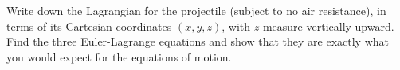 \documentclass[../main.tex]{subfiles}
\begin{document}
\begin{problema}
	Write down the Lagrangian for the projectile (subject to no air resistance),
	in terms of its Cartesian coordinates \((x, y, z)\), with \(z\) measure
	vertically upward. Find the three Euler-Lagrange equations and show that
	they are exactly what you would expect for the equations of motion.
\end{problema}
\end{document}
